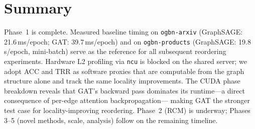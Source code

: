 \documentclass[sigconf,review]{acmart}
\begin{document}
\section{Summary}

Phase~1 is complete. Measured baseline timing on \texttt{ogbn-arxiv}
(GraphSAGE: 21.6\,ms/epoch; GAT: 39.7\,ms/epoch) and on
\texttt{ogbn-products} (GraphSAGE: 19.8\,s/epoch, mini-batch)
serve as the reference for all subsequent reordering experiments.
Hardware L2 profiling via \texttt{ncu} is blocked on the shared server;
we adopt ACC and TRR as software proxies that are computable from the
graph structure alone and track the same locality improvements.
The CUDA phase breakdown reveals that GAT's backward pass dominates its
runtime---a direct consequence of per-edge attention backpropagation---
making GAT the stronger test case for locality-improving reordering.
Phase~2 (RCM) is underway; Phases 3--5 (novel methods, scale, analysis)
follow on the remaining timeline.



\end{document}
